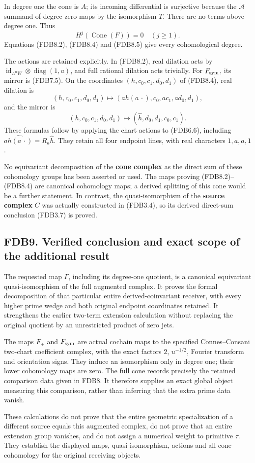 In degree one the cone is \(A\); its incoming differential is surjective
because the \(\mathcal A\) summand of degree zero maps by the
isomorphism \(T\). There are no terms above degree one. Thus \[
H^j(\operatorname{Cone}(F))=0\quad(j\ge1).
\tag{FDB8.5}
\] Equations (FDB8.2), (FDB8.4) and (FDB8.5) give every cohomological
degree.

The actions are retained explicitly. In (FDB8.2), real dilation acts by
\(\operatorname{id}_{\Lambda^nW}\otimes\operatorname{diag}(1,a)\), and
full rational dilation acts trivially. For \(F_{\rm sym}\), its mirror
is (FDB7.5). On the coordinates \((h,c_0,c_1,d_0,d_1)\) of (FDB8.4),
real dilation is \[
(h,c_0,c_1,d_0,d_1)
\longmapsto(a h(a\,\cdot),c_0,ac_1,ad_0,d_1),
\tag{FDB8.6}
\] and the mirror is \[
(h,c_0,c_1,d_0,d_1)
\longmapsto(\widehat h,d_0,d_1,c_0,c_1).
\tag{FDB8.7}
\] These formulas follow by applying the chart actions to (FDB6.6),
including \(\widehat{a h(a\,\cdot)}=R_a\widehat h\). They retain all
four endpoint lines, with real characters \(1,a,a,1\).

No equivariant decomposition of the \textbf{cone complex} as the direct
sum of these cohomology groups has been asserted or used. The maps
proving (FDB8.2)--(FDB8.4) are canonical cohomology maps; a derived
splitting of this cone would be a further statement. In contrast, the
quasi-isomorphism of the \textbf{source complex} \(C\) was actually
constructed in (FDB3.4), so its derived direct-sum conclusion (FDB3.7)
is proved.

\subsection{FDB9. Verified conclusion and exact scope of the additional
result}\label{fdb9.-verified-conclusion-and-exact-scope-of-the-additional-result}

The requested map \(\Gamma\), including its degree-one quotient, is a
canonical equivariant quasi-isomorphism of the full augmented complex.
It proves the formal decomposition of that particular entire
derived-coinvariant receiver, with every higher prime wedge and both
original endpoint coordinates retained. It strengthens the earlier
two-term extension calculation without replacing the original quotient
by an unrestricted product of zero jets.

The maps \(F_+\) and \(F_{\rm sym}\) are actual cochain maps to the
specified Connes--Consani two-chart coefficient complex, with the exact
factors \(2\), \(u^{-1/2}\), Fourier transform and orientation signs.
They induce an isomorphism only in degree one; their lower cohomology
maps are zero. The full cone records precisely the retained comparison
data given in FDB8. It therefore supplies an exact global object
measuring this comparison, rather than inferring that the extra prime
data vanish.

These calculations do not prove that the entire geometric specialization
of a different source equals this augmented complex, do not prove that
an entire extension group vanishes, and do not assign a numerical weight
to primitive \(\tau\). They establish the displayed maps,
quasi-isomorphism, actions and all cone cohomology for the original
receiving objects.
